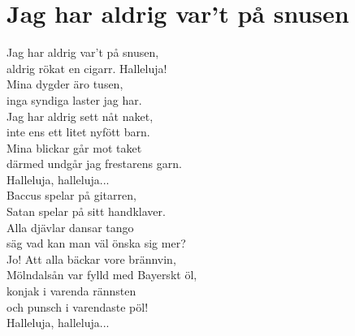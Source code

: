 \section{Jag har aldrig var't på snusen}
Jag har aldrig var't på snusen,\\
aldrig rökat en cigarr. Halleluja!\\
Mina dygder äro tusen,\\
inga syndiga laster jag har.\\
Jag har aldrig sett nåt naket,\\
inte ens ett litet nyfött barn.\\
Mina blickar går mot taket\\
därmed undgår jag frestarens garn.\\

Halleluja, halleluja...\\

Baccus spelar på gitarren,\\
Satan spelar på sitt handklaver.\\
Alla djävlar dansar tango\\
säg vad kan man väl önska sig mer?\\
Jo! Att alla bäckar vore brännvin,\\
Mölndalsån var fylld med Bayerskt öl,\\
konjak i varenda rännsten\\
och punsch i varendaste pöl!\\

Halleluja, halleluja...\\